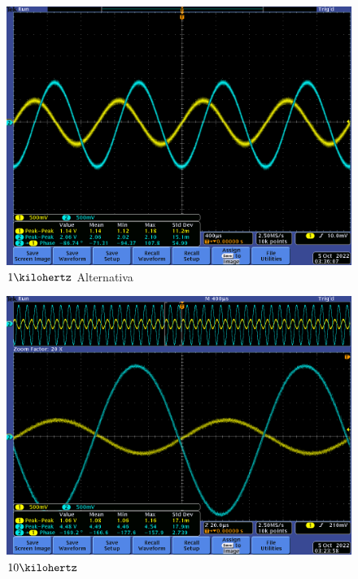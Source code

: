 \documentclass[12pt,letterpaper]{article}     %
\begin{document}
{\begin{figure}[!ht]
\centering
\includegraphics[scale=0.5]{imagenes/21.png}
\caption{$1\kilohertz$ Alternativa}
\label{fig:21}
\end{figure}

\begin{figure}[!ht]
\centering
\includegraphics[scale=0.5]{imagenes/15.png}
\caption{$10\kilohertz$}
\label{fig:15}
\end{figure}

}
\end{document}
